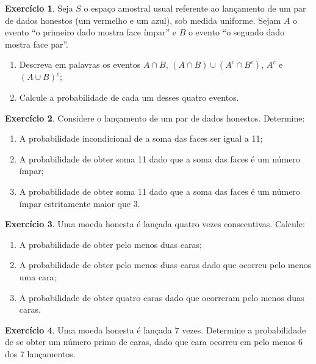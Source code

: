 \documentclass[12pt,portuguese]{article}
\theoremstyle{definition}
\newtheorem{exercise}{Exercício}
\begin{document}
\begin{exercise}\label{exercise:dados-eventos}
Seja \(S\) o espaço amostral usual referente ao lançamento de um par de dados honestos (um vermelho e um azul), sob medida uniforme. Sejam \(A\) o evento ``o primeiro dado mostra face ímpar'' e \(B\) o evento ``o segundo dado mostra face par''.
\begin{enumerate}[label=(\alph*)]
  \item Descreva em palavras os eventos \(A \cap B\), \((A \cap B) \cup (A^c \cap B^c)\), \(A^c\) e \((A \cup B)^c\);
  \item Calcule a probabilidade de cada um desses quatro eventos.
\end{enumerate}
\end{exercise}

\begin{exercise}\label{exercise:soma-11}
Considere o lançamento de um par de dados honestos. Determine:
\begin{enumerate}[label=(\alph*)]
  \item A probabilidade incondicional de a soma das faces ser igual a 11;
  \item A probabilidade de obter soma 11 dado que a soma das faces é um número ímpar;
  \item A probabilidade de obter soma 11 dado que a soma das faces é um número ímpar estritamente maior que 3.
\end{enumerate}
\end{exercise}

\begin{exercise}\label{exercise:moeda-quatro}
Uma moeda honesta é lançada quatro vezes consecutivas. Calcule:
\begin{enumerate}[label=(\alph*)]
  \item A probabilidade de obter pelo menos duas caras;
  \item A probabilidade de obter pelo menos duas caras dado que ocorreu pelo menos uma cara;
  \item A probabilidade de obter quatro caras dado que ocorreram pelo menos duas caras.
\end{enumerate}
\end{exercise}

\begin{exercise}\label{exercise:sete-moedas}
Uma moeda honesta é lançada 7 vezes. Determine a probabilidade de se obter um número primo de caras, dado que cara ocorreu em pelo menos 6 dos 7 lançamentos.
\end{exercise}
\end{document}
